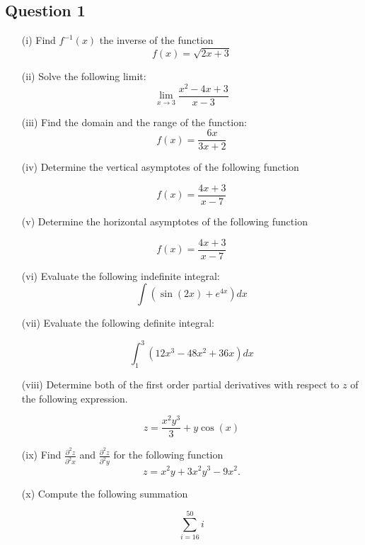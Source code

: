 ﻿ \documentclass[a4paper,12pt]{article}
\begin{document}
\subsection*{Question 1}
\begin{itemize}

	\item[(i)] Find $f^{-1}(x)$ the inverse of the function
	\[f(x) = \sqrt{2x+3} \]
	
	\item[(ii)]	Solve the following limit:
	\[\lim_{x \to 3 } \frac{x^2-4x +3}{x-3}\]
	
	\item[(iii)] Find the domain and the range of the function:
	\[ f(x) = \frac{6x}{3x+2} \]


\item[(iv)] Determine the vertical asymptotes of the following function

\[  f(x)  = \frac{4x+3}{x-7} \]



\item[(v)]	Determine the horizontal asymptotes of the following function

\[  f(x)  = \frac{4x+3}{x-7} \]







\item[(vi)] Evaluate the following indefinite integral:
\[ \int (\sin(2x)+e^{4x}) dx   \]
\item[(vii)] Evaluate the following definite integral:

\[  \int^3_1 (12x^3 -48x^2 +36x) dx \]

\item[(viii)] Determine both of the first order partial derivatives with respect to $z$ of the following expression.

\[ z = \frac{x^2y^3}{3} +  y \cos(x)\]
 

	\item[(ix)] Find $\displaystyle{ \frac{ \partial^2 z }{ \partial^2 x  }}$ and $\displaystyle{ \frac{ \partial^2 z }{ \partial^2 y }}$  for the following function
	\[ z = x^2y + 3x^2y^3 - 9x^2.\]	
	
	

\item[(x)]  Compute the following summation

\[ \sum_{i=16}^{50} i \]
\end{itemize}
\end{document}
